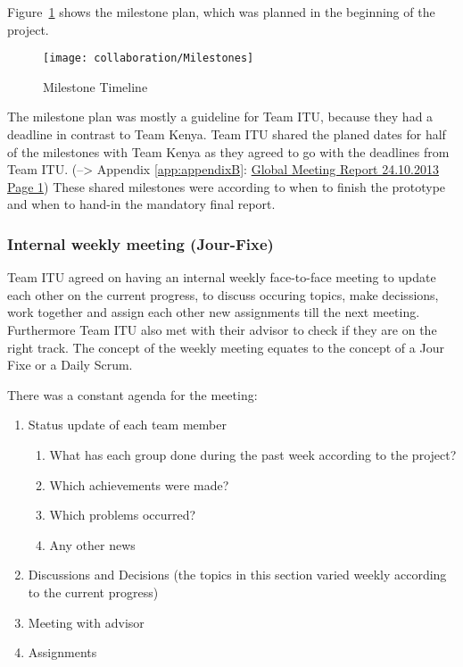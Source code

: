 Figure~\ref{fig:milestones} shows the milestone plan, which was planned in the beginning of the project.

	\begin{figure}[tb]
		\centering
		\texttt{[image: collaboration/Milestones]}
		\caption{Milestone Timeline}
		\label{fig:milestones}
	\end{figure}

The milestone plan was mostly a guideline for Team ITU, because they had a deadline in contrast to Team Kenya. Team ITU shared the planed dates for half of the milestones with Team Kenya as they agreed to go with the deadlines from Team ITU. (--> Appendix \ref{app:appendixB}: \hyperlink{GSD20131024.1}{Global Meeting Report 24.10.2013 Page 1}) These shared milestones were according to when to finish the prototype and when to hand-in the mandatory final report.


\subsubsection{Internal weekly meeting (Jour-Fixe)}
\label{sec:internal_meeting}
Team ITU agreed on having an internal weekly face-to-face meeting to update each other on the current progress, to discuss occuring topics, make decissions, work together and assign each other new assignments till the next meeting. Furthermore Team ITU also met with their advisor to check if they are on the right track. The concept of the weekly meeting equates to the concept of a Jour Fixe\cite{jour_fixe} or a Daily Scrum\cite{scrum}.

There was a constant agenda for the meeting:

	\begin{enumerate}
		\item Status update of each team member
			\begin{enumerate}
				\item What has each group done during the past week according to the project?
				\item Which achievements were made?	
				\item Which problems occurred?
				\item Any other news
			\end{enumerate}
		\item Discussions and Decisions (the topics in this section varied weekly according to the current progress)
		\item Meeting with advisor	
		\item Assignments
	\end{enumerate}

